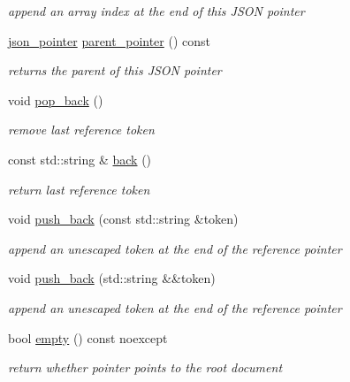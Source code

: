 \begin{DoxyCompactItemize}
\begin{DoxyCompactList}\small\item\em append an array index at the end of this J\+S\+ON pointer \end{DoxyCompactList}\item 
\hyperlink{classnlohmann_1_1json__pointer}{json\+\_\+pointer} \hyperlink{classnlohmann_1_1json__pointer_afdaacce1edb7145e0434e014f0e8685a}{parent\+\_\+pointer} () const
\begin{DoxyCompactList}\small\item\em returns the parent of this J\+S\+ON pointer \end{DoxyCompactList}\item 
void \hyperlink{classnlohmann_1_1json__pointer_a4b1ee4d511ca195bed896a3da47e264c}{pop\+\_\+back} ()
\begin{DoxyCompactList}\small\item\em remove last reference token \end{DoxyCompactList}\item 
const std\+::string \& \hyperlink{classnlohmann_1_1json__pointer_a6bd5b554c10f15672135c216893eef31}{back} ()
\begin{DoxyCompactList}\small\item\em return last reference token \end{DoxyCompactList}\item 
void \hyperlink{classnlohmann_1_1json__pointer_a697d12b5bd6205f8866691b166b7c7dc}{push\+\_\+back} (const std\+::string \&token)
\begin{DoxyCompactList}\small\item\em append an unescaped token at the end of the reference pointer \end{DoxyCompactList}\item 
void \hyperlink{classnlohmann_1_1json__pointer_ac228b13596d3c34185da9fe61b570194}{push\+\_\+back} (std\+::string \&\&token)
\begin{DoxyCompactList}\small\item\em append an unescaped token at the end of the reference pointer \end{DoxyCompactList}\item 
bool \hyperlink{classnlohmann_1_1json__pointer_a649252bda4a2e75a0915b11a25d8bcc3}{empty} () const noexcept
\begin{DoxyCompactList}\small\item\em return whether pointer points to the root document \end{DoxyCompactList}\end{DoxyCompactItemize}
